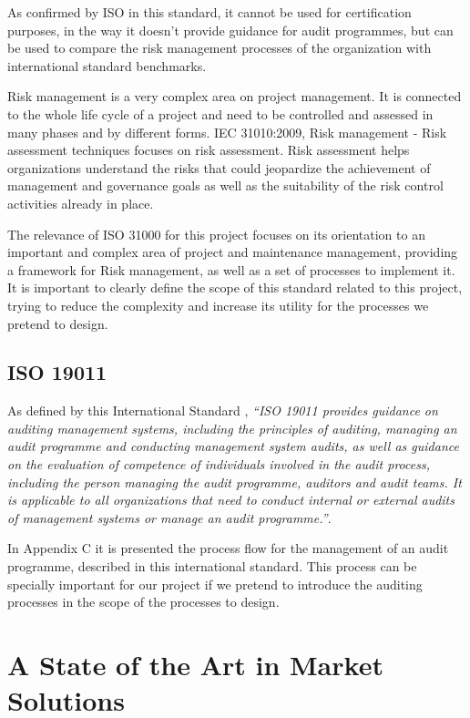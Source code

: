 As confirmed by ISO in this standard, it cannot be used for certification purposes, in the way it doesn't provide guidance for audit programmes, but can be used to compare the risk management processes of the organization with international standard benchmarks.\par
Risk management is a very complex area on project management. It is connected to the whole life cycle of a project and need to be controlled and assessed in many phases and by different forms. IEC 31010:2009, Risk management - Risk assessment techniques focuses on risk assessment. Risk assessment helps organizations understand the risks that could jeopardize the achievement of management and governance goals as well as the suitability of the risk control activities already in place.\cite{IEC31010}\par
The relevance of ISO 31000 for this project focuses on its orientation to an important and complex area of project and maintenance management, providing a framework for Risk management, as well as a set of processes to implement it. It is important to clearly define the scope of this standard related to this project, trying to reduce the complexity and increase its utility for the processes we pretend to design.


\subsection{ISO 19011}

As defined by this International Standard \cite{ISO19011}, \textit{``ISO 19011 provides guidance on auditing management systems, including the principles of auditing, managing an audit programme and conducting management system audits, as well as guidance on the evaluation of competence of individuals involved in the audit process, including the person managing the audit programme, auditors and audit teams. It is applicable to all organizations that need to conduct internal or external audits of management systems or manage an audit programme.''}.\par
In Appendix C it is presented the process flow for the management of an audit programme, described in this international standard. This process can be specially important for our project if we pretend to introduce the auditing processes in the scope of the processes to design.\par


\section{A State of the Art in Market Solutions}

